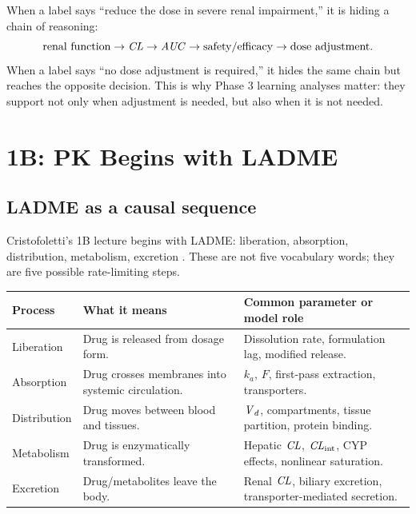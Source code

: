 \documentclass[a4paper]{article}
\newcommand{\CL}{\ensuremath{\pksym{CL}}}
\newcommand{\Vd}{\ensuremath{\pksym{V}_d}}
\newcommand{\AUC}{\ensuremath{\pksym{AUC}}}
\newcommand{\ka}{\ensuremath{k_a}}
\newcommand{\Fbio}{\ensuremath{F}}
\begin{document}
When a label says ``reduce the dose in severe renal impairment,'' it is hiding a chain of reasoning:
\[
  \text{renal function}
  \rightarrow
  \CL{}
  \rightarrow
  \AUC{}
  \rightarrow
  \text{safety/efficacy}
  \rightarrow
  \text{dose adjustment}.
\]
When a label says ``no dose adjustment is required,'' it hides the same chain but reaches the opposite decision. This is why Phase 3 learning analyses matter: they support not only when adjustment is needed, but also when it is not needed.

\section{1B: PK Begins with LADME}

\subsection{LADME as a causal sequence}

Cristofoletti's 1B lecture begins with LADME: liberation, absorption, distribution, metabolism, excretion \cite{ufPha6125Lesson1B2020}. These are not five vocabulary words; they are five possible rate-limiting steps.

\begin{center}
\footnotesize
\begin{tabularx}{\textwidth}{p{}X X}
\toprule
Process & What it means & Common parameter or model role \\
\midrule
Liberation & Drug is released from dosage form. & Dissolution rate, formulation lag, modified release. \\
Absorption & Drug crosses membranes into systemic circulation. & \(\ka\), \Fbio, first-pass extraction, transporters. \\
Distribution & Drug moves between blood and tissues. & \Vd, compartments, tissue partition, protein binding. \\
Metabolism & Drug is enzymatically transformed. & Hepatic \CL, \(\CL_{\pklab{int}}\), CYP effects, nonlinear saturation. \\
Excretion & Drug/metabolites leave the body. & Renal \CL, biliary excretion, transporter-mediated secretion. \\
\bottomrule
\end{tabularx}
\end{center}
\end{document}
